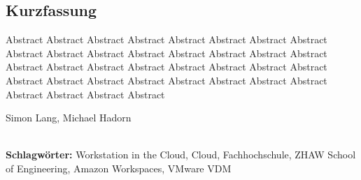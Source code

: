 
\subsection*{Kurzfassung}
Abstract Abstract Abstract Abstract Abstract Abstract Abstract Abstract Abstract Abstract Abstract Abstract Abstract Abstract Abstract Abstract Abstract Abstract Abstract Abstract Abstract Abstract Abstract Abstract Abstract Abstract Abstract Abstract Abstract Abstract Abstract Abstract Abstract Abstract Abstract Abstract 

Simon Lang, Michael Hadorn


%
\mbox{}\\[0.5\baselineskip]\noindent
\textbf{Schlagwörter:} 
Workstation in the Cloud, Cloud, Fachhochschule, ZHAW School of Engineering, Amazon Workspaces, VMware VDM
